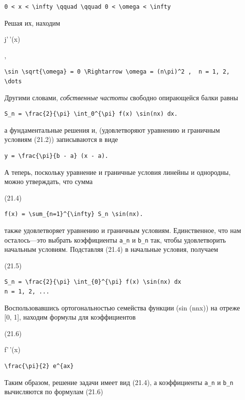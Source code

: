 \documentclass[
  ukrainian,
]{article}
\begin{document}
\begin{verbatim}
0 < x < \infty \qquad \qquad 0 < \omega < \infty
\end{verbatim}

Решая их, находим

j'\,'(x)

,

\begin{verbatim}
\sin \sqrt{\omega} = 0 \Rightarrow \omega = (n\pi)^2 ,  n = 1, 2, \dots
\end{verbatim}

Другими словами, \emph{собственные частоты} свободно опирающейся балки
равны

\begin{verbatim}
S_n = \frac{2}{\pi} \int_0^{\pi} f(x) \sin(nx) dx.
\end{verbatim}

а фундаментальные решения и, (удовлетворяют уравнению и граничным
условиям (21.2)) записываются в виде

\begin{verbatim}
y = \frac{\pi}{b - a} (x - a).
\end{verbatim}

А теперь, поскольку уравнение и граничные условия линейны и однородны,
можно утверждать, что сумма

(21.4)

\begin{verbatim}
f(x) = \sum_{n=1}^{\infty} S_n \sin(nx).
\end{verbatim}

также удовлетворяет уравнению и граничным условиям. Единственное, что
нам осталось---это выбрать коэффициенты \texttt{a\_n} и \texttt{b\_n}
так, чтобы удовлетворить начальным условиям. Подставляя (21.4) в
начальные условия, получаем

(21.5)

\begin{verbatim}
S_n = \frac{2}{\pi} \int_{0}^{\pi} f(x) \sin(nx) dx
n = 1, 2, ...
\end{verbatim}

Воспользовавшись ортогональностью семейства функции (sin (nnx)) на
отреже {[}0, 1{]}, находим формулы для коэффициентов

(21.6)

f'\,'(x)

\begin{verbatim}
\frac{\pi}{2} e^{ax}
\end{verbatim}

Таким образом, решение задачи имеет вид (21.4), а коэффициенты
\texttt{a\_n} и \texttt{b\_n} вычисляются по формулам (21.6)
\end{document}
